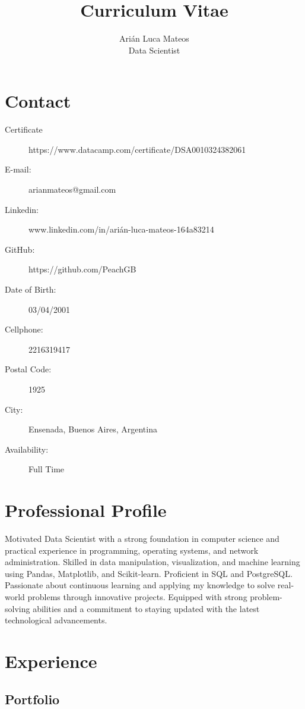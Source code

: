 \documentclass{article}
\title{Curriculum Vitae}
\author{Arián Luca Mateos  \\
\large   Data Scientist}
\renewcommand{\maketitle}{
\begin{center}
{\huge\bfseries\theauthor}
\end{center}
}
\begin{document}
\maketitle
\section{Contact}
\begin{description}

\item[Certificate] https://www.datacamp.com/certificate/DSA0010324382061
\item[E-mail:]arianmateos@gmail.com
\item[Linkedin:] www.linkedin.com/in/arián-luca-mateos-164a83214

\item[GitHub:] https://github.com/PeachGB

\item[Date of Birth:]03/04/2001 

\item[Cellphone:]2216319417

\item[Postal Code:]1925

\item[City:]Ensenada, Buenos Aires, Argentina
\item[Availability:] Full Time

\end{description}
\section{Professional Profile}
Motivated Data Scientist with a strong foundation in computer science and practical experience in programming, operating systems, and network administration. Skilled in data manipulation, visualization, and machine learning using Pandas, Matplotlib, and Scikit-learn. Proficient in SQL and PostgreSQL. Passionate about continuous learning and applying my knowledge to solve real-world problems through innovative projects. Equipped with strong problem-solving abilities and a commitment to staying updated with the latest technological advancements.
\section{Experience}
\subsection{Portfolio}
\end{document}
